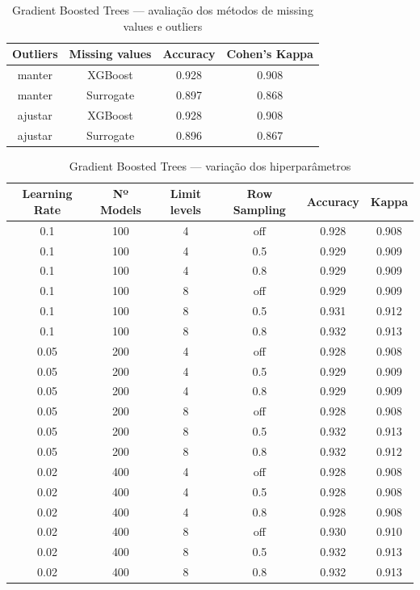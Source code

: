 \documentclass[11pt,a4paper]{article}
\begin{document}
\begin{table}[H]
    \centering
    \caption{Gradient Boosted Trees --- avaliação dos métodos de missing values e outliers}
    \label{tab:gbt_missing_outliers}
    \begin{tabular}{cccc}
    \toprule
    Outliers & Missing values & Accuracy & Cohen's Kappa \\
    \midrule
    manter & XGBoost & 0.928 & 0.908 \\
    manter & Surrogate & 0.897 & 0.868 \\
    ajustar & XGBoost & 0.928 & 0.908 \\
    ajustar & Surrogate & 0.896 & 0.867 \\
    \bottomrule
    \end{tabular}
\end{table}

\begin{table}[H]
    \centering
    \caption{Gradient Boosted Trees --- variação dos hiperparâmetros}
    \label{tab:gbt_hiperparametros}
    \begin{tabular}{cccccc}
    \toprule
    Learning Rate & Nº Models & Limit levels & Row Sampling & Accuracy & Kappa \\
    \midrule
    0.1 & 100 & 4 & off & 0.928 & 0.908 \\
    0.1 & 100 & 4 & 0.5 & 0.929 & 0.909 \\
    0.1 & 100 & 4 & 0.8 & 0.929 & 0.909 \\
    0.1 & 100 & 8 & off & 0.929 & 0.909 \\
    0.1 & 100 & 8 & 0.5 & 0.931 & 0.912 \\
    0.1 & 100 & 8 & 0.8 & 0.932 & 0.913 \\
    0.05 & 200 & 4 & off & 0.928 & 0.908 \\
    0.05 & 200 & 4 & 0.5 & 0.929 & 0.909 \\
    0.05 & 200 & 4 & 0.8 & 0.929 & 0.909 \\
    0.05 & 200 & 8 & off & 0.928 & 0.908 \\
    0.05 & 200 & 8 & 0.5 & 0.932 & 0.913 \\
    0.05 & 200 & 8 & 0.8 & 0.932 & 0.912 \\
    0.02 & 400 & 4 & off & 0.928 & 0.908 \\
    0.02 & 400 & 4 & 0.5 & 0.928 & 0.908 \\
    0.02 & 400 & 4 & 0.8 & 0.928 & 0.908 \\
    0.02 & 400 & 8 & off & 0.930 & 0.910 \\
    0.02 & 400 & 8 & 0.5 & 0.932 & 0.913 \\
    0.02 & 400 & 8 & 0.8 & 0.932 & 0.913 \\
    \bottomrule
    \end{tabular}
\end{table}
\end{document}
